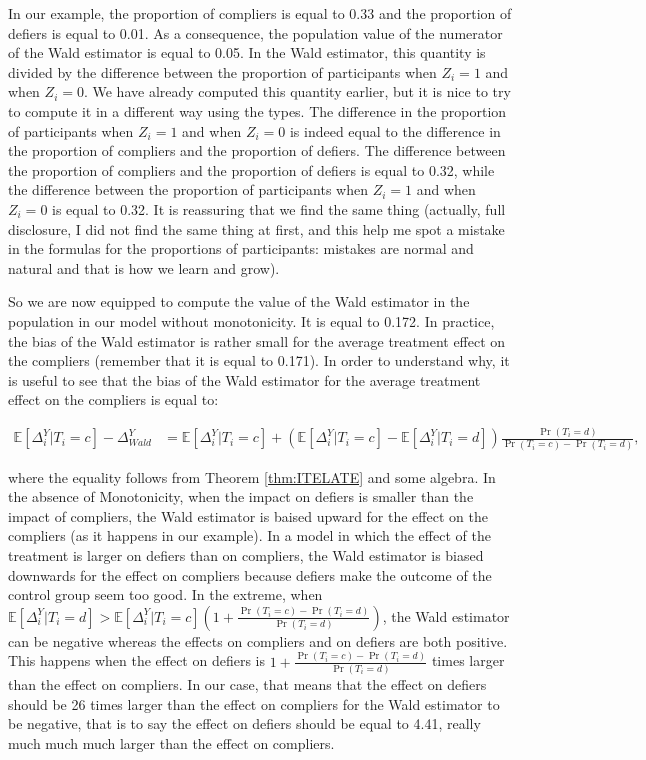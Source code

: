 \documentclass[
]{book}
\newcommand{\esp}[1]{\mathbb{E}[ #1 ]}
\theoremstyle{definition}
\theoremstyle{definition}
\theoremstyle{definition}
\theoremstyle{definition}
\theoremstyle{remark}
\begin{document}
In our example, the proportion of compliers is equal to 0.33 and the proportion of defiers is equal to 0.01.
As a consequence, the population value of the numerator of the Wald estimator is equal to 0.05.
In the Wald estimator, this quantity is divided by the difference between the proportion of participants when \(Z_i=1\) and when \(Z_i=0\).
We have already computed this quantity earlier, but it is nice to try to compute it in a different way using the types.
The difference in the proportion of participants when \(Z_i=1\) and when \(Z_i=0\) is indeed equal to the difference in the proportion of compliers and the proportion of defiers.
The difference between the proportion of compliers and the proportion of defiers is equal to 0.32, while the difference between the proportion of participants when \(Z_i=1\) and when \(Z_i=0\) is equal to 0.32.
It is reassuring that we find the same thing (actually, full disclosure, I did not find the same thing at first, and this help me spot a mistake in the formulas for the proportions of participants: mistakes are normal and natural and that is how we learn and grow).

So we are now equipped to compute the value of the Wald estimator in the population in our model without monotonicity.
It is equal to 0.172.
In practice, the bias of the Wald estimator is rather small for the average treatment effect on the compliers (remember that it is equal to 0.171).
In order to understand why, it is useful to see that the bias of the Wald estimator for the average treatment effect on the compliers is equal to:

\begin{align*}
  \esp{\Delta_i^Y|T_i=c}-\Delta^Y_{Wald} & = \esp{\Delta_i^Y|T_i=c} + (\esp{\Delta_i^Y|T_i=c}-\esp{\Delta_i^Y|T_i=d})\frac{\Pr(T_i=d)}{\Pr(T_i=c)-\Pr(T_i=d)},
\end{align*}

where the equality follows from Theorem \ref{thm:ITELATE} and some algebra.
In the absence of Monotonicity, when the impact on defiers is smaller than the impact of compliers, the Wald estimator is baised upward for the effect on the compliers (as it happens in our example).
In a model in which the effect of the treatment is larger on defiers than on compliers, the Wald estimator is biased downwards for the effect on compliers because defiers make the outcome of the control group seem too good.
In the extreme, when \(\esp{\Delta_i^Y|T_i=d}>\esp{\Delta_i^Y|T_i=c}(1+\frac{\Pr(T_i=c)-\Pr(T_i=d)}{\Pr(T_i=d)})\), the Wald estimator can be negative whereas the effects on compliers and on defiers are both positive.
This happens when the effect on defiers is \(1+\frac{\Pr(T_i=c)-\Pr(T_i=d)}{\Pr(T_i=d)}\) times larger than the effect on compliers.
In our case, that means that the effect on defiers should be 26 times larger than the effect on compliers for the Wald estimator to be negative, that is to say the effect on defiers should be equal to 4.41, really much much much larger than the effect on compliers.
\end{document}
